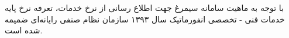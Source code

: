 با توجه به ماهیت سامانه سیمرغ جهت اطلاع رسانی از نرخ خدمات، تعرفه نرخ پایه خدمات فنی - تخصصی انفورماتیک سال ۱۳۹۳ سازمان نظام صنفی رایانه‌ای ضمیمه شده است.
